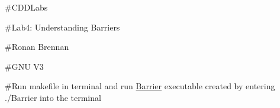 \#\+C\+D\+D\+Labs

\#\+Lab4\+: Understanding Barriers

\#\+Ronan Brennan

\#\+G\+NU V3

\#\+Run makefile in terminal and run \mbox{\hyperlink{class_barrier}{Barrier}} executable created by entering ./\+Barrier into the terminal 